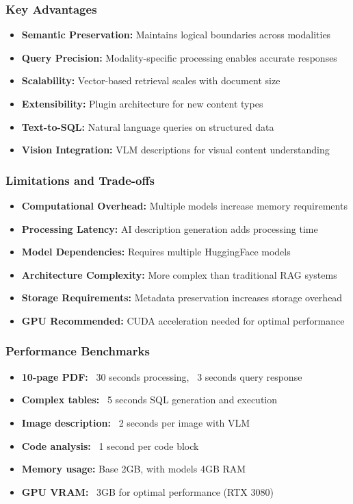 \begin{frame}[fragile]\frametitle{Key Advantages}
\begin{itemize}
\item \textbf{Semantic Preservation:} Maintains logical boundaries across modalities
\item \textbf{Query Precision:} Modality-specific processing enables accurate responses
\item \textbf{Scalability:} Vector-based retrieval scales with document size
\item \textbf{Extensibility:} Plugin architecture for new content types
\item \textbf{Text-to-SQL:} Natural language queries on structured data
\item \textbf{Vision Integration:} VLM descriptions for visual content understanding
\end{itemize}
\end{frame}

\begin{frame}[fragile]\frametitle{Limitations and Trade-offs}
\begin{itemize}
\item \textbf{Computational Overhead:} Multiple models increase memory requirements
\item \textbf{Processing Latency:} AI description generation adds processing time
\item \textbf{Model Dependencies:} Requires multiple HuggingFace models
\item \textbf{Architecture Complexity:} More complex than traditional RAG systems
\item \textbf{Storage Requirements:} Metadata preservation increases storage overhead
\item \textbf{GPU Recommended:} CUDA acceleration needed for optimal performance
\end{itemize}
\end{frame}

\begin{frame}[fragile]\frametitle{Performance Benchmarks}
\begin{itemize}
\item \textbf{10-page PDF:} ~30 seconds processing, ~3 seconds query response
\item \textbf{Complex tables:} ~5 seconds SQL generation and execution
\item \textbf{Image description:} ~2 seconds per image with VLM
\item \textbf{Code analysis:} ~1 second per code block
\item \textbf{Memory usage:} Base 2GB, with models 4GB RAM
\item \textbf{GPU VRAM:} ~3GB for optimal performance (RTX 3080)
\end{itemize}
\end{frame}

